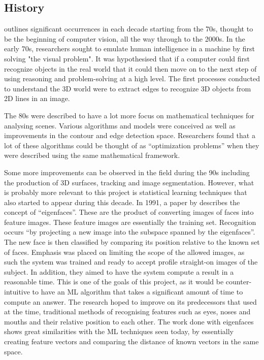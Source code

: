 \documentclass[12pt,a4paper]{report}
\begin{document}
\subsection{History}

\citet{SzeliskiRichard2011CV:A} outlines significant occurrences in each decade starting from the 70s, 
thought to be the beginning of computer vision, all the way through to the 2000s. In the early 70s, researchers sought 
to emulate human intelligence in a machine by first solving "the visual problem". It was hypothesised that if a computer 
could first recognize objects in the real world that it could then move on to the next step of using reasoning and 
problem-solving at a high level. The first processes conducted to understand the 3D world were to extract edges to 
recognize 3D objects from 2D lines in an image.

\par

The 80s were described to have a lot more focus on mathematical techniques for analysing scenes. Various algorithms 
and models were conceived as well as improvements in the contour and edge detection space. Researchers found that a 
lot of these algorithms could be thought of as “optimization problems” when they were described using the same 
mathematical framework.

\par

Some more improvements can be observed in the field during the 90s including the production of 3D surfaces, tracking 
and image 
segmentation. However, what is probably more relevant to this project is statistical learning techniques that also 
started to appear during this decade. In 1991, a paper by \citet{turk1991face} describes
the concept of “eigenfaces”. These are the product of converting images of faces into feature images. These feature 
images are essentially the training set. Recognition occurs “by projecting a new image into the subspace spanned by 
the eigenfaces”. The new face is then classified by comparing its position relative to the known set of faces. 
Emphasis was placed on limiting the scope of the allowed images, as such the system was trained and ready to 
accept profile straight-on images of the subject. In addition, they aimed to have the system compute a result
in a reasonable time. This is one of the goals of this project, as it would be counter-intuitive to have an ML algorithm 
that takes a significant amount of time to compute an answer.
The research hoped to improve on its 
predecessors that used at the time, traditional methods of recognising features such as eyes, noses and mouths and 
their relative position to each other. The work done with eigenfaces shows great similarities with the ML
techniques seen today, by essentially creating feature vectors and comparing the distance of known 
vectors in the same space.
\end{document}
